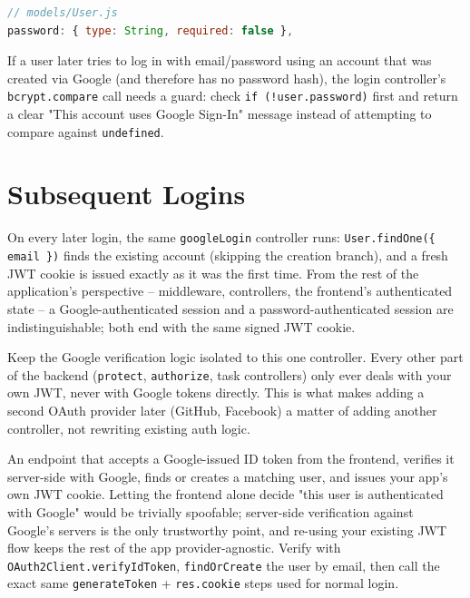\begin{lstlisting}[language=JavaScript]
// models/User.js
password: { type: String, required: false },
\end{lstlisting}

\begin{notebox}[NOTE]
If a user later tries to log in with email/password using an account that
was created via Google (and therefore has no password hash), the login
controller's \texttt{bcrypt.compare} call needs a guard: check
\texttt{if (!user.password)} first and return a clear "This account uses
Google Sign-In" message instead of attempting to compare against
\texttt{undefined}.
\end{notebox}

\section{Subsequent Logins}

On every later login, the same \texttt{googleLogin} controller runs:
\texttt{User.findOne(\{ email \})} finds the existing account (skipping the
creation branch), and a fresh JWT cookie is issued exactly as it was the
first time. From the rest of the application's perspective -- middleware,
controllers, the frontend's authenticated state -- a Google-authenticated
session and a password-authenticated session are indistinguishable; both end
with the same signed JWT cookie.

\begin{tipbox}[TIP]
Keep the Google verification logic isolated to this one controller. Every
other part of the backend (\texttt{protect}, \texttt{authorize}, task
controllers) only ever deals with your own JWT, never with Google tokens
directly. This is what makes adding a second OAuth provider later
(GitHub, Facebook) a matter of adding another controller, not rewriting
existing auth logic.
\end{tipbox}

\whatwhyhow
{An endpoint that accepts a Google-issued ID token from the frontend, verifies it server-side with Google, finds or creates a matching user, and issues your app's own JWT cookie.}
{Letting the frontend alone decide "this user is authenticated with Google" would be trivially spoofable; server-side verification against Google's servers is the only trustworthy point, and re-using your existing JWT flow keeps the rest of the app provider-agnostic.}
{Verify with \texttt{OAuth2Client.verifyIdToken}, \texttt{findOrCreate} the user by email, then call the exact same \texttt{generateToken} + \texttt{res.cookie} steps used for normal login.}
